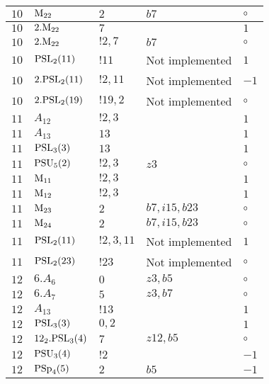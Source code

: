 \documentclass[a4paper, 11pt]{article}
\begin{document}
\begin{longtable}{lllll}
        $ 10 $ & $ {\rm M}_{22} $ & $ 2 $ & $ b7 $ &  $\circ$ \\ \hline
        $ 10 $ & $ 2.{\rm M}_{22} $ & $ 7 $ & $ ~ $ & $ 1$ \\ \hline
        $ 10 $ & $ 2.{\rm M}_{22} $ & $ ! 2,7 $ & $ b7 $ &  $\circ$ \\ \hline
        $ 10 $ & $ {\rm PSL}_{2}(11) $ & $ !11 $ &  Not implemented & $ 1$ \\ \hline
        $ 10 $ & $ 2.{\rm PSL}_{2}(11) $ & $ !2, 11 $ &  Not implemented & $ -1$ \\ \hline
        $ 10 $ & $ 2.{\rm PSL}_{2}(19) $ & $ !19, 2 $ &  Not implemented &  $\circ$ \\ \hline
        $ 11 $ & $ A_{12} $ & $ ! 2,3 $ & $ ~ $ & $ 1$ \\ \hline
        $ 11 $ & $ A_{13} $ & $ 13 $ & $ ~ $ & $ 1$ \\ \hline
        $ 11 $ & $ {\rm PSL}_{3}(3) $ & $ 13 $ & $ ~ $ & $ 1$ \\ \hline
        $ 11 $ & $ {\rm PSU}_{5}(2) $ & $ ! 2,3 $ & $ z3 $ &  $\circ$ \\ \hline
        $ 11 $ & $ {\rm M}_{11} $ & $ ! 2,3 $ & $ ~ $ & $ 1$ \\ \hline
        $ 11 $ & $ {\rm M}_{12} $ & $ ! 2,3 $ & $ ~ $ & $ 1$ \\ \hline
        $ 11 $ & $ {\rm M}_{23} $ & $ 2 $ & $ b7, i15, b23 $ &  $\circ$ \\ \hline
        $ 11 $ & $ {\rm M}_{24} $ & $ 2 $ & $ b7, i15, b23 $ &  $\circ$ \\ \hline
        $ 11 $ & $ {\rm PSL}_{2}(11) $ & $ !2, 3, 11 $ &  Not implemented & $ 1$ \\ \hline
        $ 11 $ & $ {\rm PSL}_{2}(23) $ & $ !23 $ &  Not implemented &  $\circ$ \\ \hline
        $ 12 $ & $ 6.A_{6} $ & $ 0 $ & $ z3, b5 $ &  $\circ$ \\ \hline
        $ 12 $ & $ 6.A_{7} $ & $ 5 $ & $ z3, b7 $ &  $\circ$ \\ \hline
        $ 12 $ & $ A_{13} $ & $ ! 13 $ & $ ~ $ & $ 1$ \\ \hline
        $ 12 $ & $ {\rm PSL}_{3}(3) $ & $ 0,2 $ & $ ~ $ & $ 1$ \\ \hline
        $ 12 $ & $ 12_2.{\rm PSL}_{3}(4) $ & $ 7 $ & $ z12, b5 $ &  $\circ$ \\ \hline
        $ 12 $ & $ {\rm PSU}_{3}(4) $ & $ ! 2 $ & $ ~ $ & $ -1$ \\ \hline
        $ 12 $ & $ {\rm PSp}_{4}(5) $ & $ 2 $ & $ b5 $ & $ -1$ \\ \hline

\end{longtable}
\end{document}
